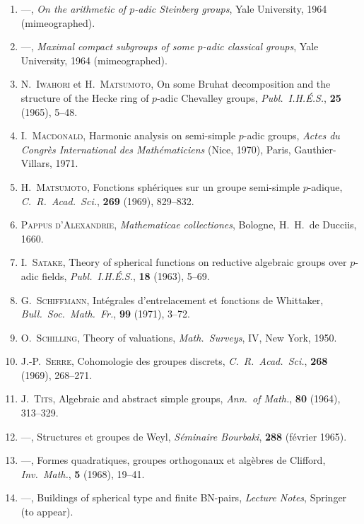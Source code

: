 \documentclass[12pt,a4paper,oneside,english]{smfart}
\theoremstyle{definition}
\theoremstyle{bt}
\begin{document}
\begin{enumerate}[leftmargin=3.4em,labelwidth=3em,labelsep=0.4em,align=left,itemsep=1pt]
\item[{[26]}]\hypertarget{bib:26}{} ---, \emph{On the arithmetic of $p$-adic Steinberg groups}, Yale University, 1964 (mimeographed).
\item[{[27]}]\hypertarget{bib:27}{} ---, \emph{Maximal compact subgroups of some $p$-adic classical groups}, Yale University, 1964 (mimeographed).
\item[{[28]}]\hypertarget{bib:28}{} N.~\textsc{Iwahori} et H.~\textsc{Matsumoto}, On some Bruhat decomposition and the structure of the Hecke ring of $p$-adic Chevalley groups, \emph{Publ.\ I.H.É.S.}, \textbf{25} (1965), 5--48.
\item[{[29]}]\hypertarget{bib:29}{} I.~\textsc{Macdonald}, Harmonic analysis on semi-simple $p$-adic groups, \emph{Actes du Congrès International des Mathématiciens} (Nice, 1970), Paris, Gauthier-Villars, 1971.
\item[{[30]}]\hypertarget{bib:30}{} H.~\textsc{Matsumoto}, Fonctions sphériques sur un groupe semi-simple $p$-adique, \emph{C.\ R.\ Acad.\ Sci.}, \textbf{269} (1969), 829--832.
\item[{[31]}]\hypertarget{bib:31}{} \textsc{Pappus d'Alexandrie}, \emph{Mathematicae collectiones}, Bologne, H.~H.~de Ducciis, 1660.
\item[{[32]}]\hypertarget{bib:32}{} I.~\textsc{Satake}, Theory of spherical functions on reductive algebraic groups over $p$-adic fields, \emph{Publ.\ I.H.É.S.}, \textbf{18} (1963), 5--69.
\item[{[33]}]\hypertarget{bib:33}{} G.~\textsc{Schiffmann}, Intégrales d'entrelacement et fonctions de Whittaker, \emph{Bull.\ Soc.\ Math.\ Fr.}, \textbf{99} (1971), 3--72.
\item[{[34]}]\hypertarget{bib:34}{} O.~\textsc{Schilling}, Theory of valuations, \emph{Math.\ Surveys}, IV, New York, 1950.
\item[{[35]}]\hypertarget{bib:35}{} J.-P.~\textsc{Serre}, Cohomologie des groupes discrets, \emph{C.\ R.\ Acad.\ Sci.}, \textbf{268} (1969), 268--271.
\item[{[36]}]\hypertarget{bib:36}{} J.~\textsc{Tits}, Algebraic and abstract simple groups, \emph{Ann.\ of Math.}, \textbf{80} (1964), 313--329.
\item[{[37]}]\hypertarget{bib:37}{} ---, Structures et groupes de Weyl, \emph{Séminaire Bourbaki}, \textbf{288} (février 1965).
\item[{[38]}]\hypertarget{bib:38}{} ---, Formes quadratiques, groupes orthogonaux et algèbres de Clifford, \emph{Inv.\ Math.}, \textbf{5} (1968), 19--41.
\item[{[39]}]\hypertarget{bib:39}{} ---, Buildings of spherical type and finite BN-pairs, \emph{Lecture Notes}, Springer (to appear).
\end{enumerate}
\normalsize
\end{document}
